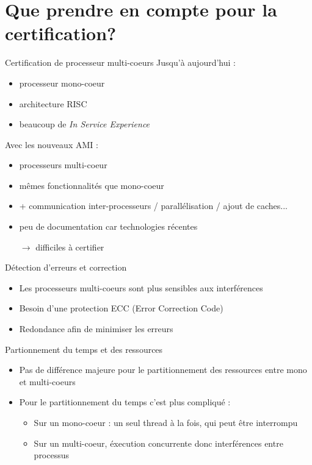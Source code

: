 \documentclass{beamer}
\begin{document}
\section[Certification]{Que prendre en compte pour la certification?}%
\label{sec:certification}
 
\begin{frame}{Certification de processeur multi-coeurs}
	Jusqu'à aujourd'hui :\pause
	\begin{itemize}
		\item processeur mono-coeur\pause
		\item architecture RISC\pause
		\item beaucoup de \textit{In Service Experience}\pause
	\end{itemize}
	Avec les nouveaux AMI :\pause
	\begin{itemize}
		\item processeurs multi-coeur\pause
		\item mêmes fonctionnalités que mono-coeur\pause
		\item + communication inter-processeurs / parallélisation / ajout de caches...\pause
		\item peu de documentation car technologies récentes\pause
		\item[$\rightarrow$] difficiles à certifier
	\end{itemize}
\end{frame}

\begin{frame}{Détection d'erreurs et correction}
	\begin{itemize}
		\item Les processeurs multi-coeurs sont plus sensibles aux interférences\pause
		\item Besoin d'une protection ECC (Error Correction Code)\pause
		\item Redondance afin de minimiser les erreurs
	\end{itemize}
\end{frame}

\begin{frame}{Partionnement du temps et des ressources}
	\begin{itemize}
		\item Pas de différence majeure pour le partitionnement des ressources entre mono
			et multi-coeurs\pause
		\item Pour le partitionnement du temps c'est plus compliqué :\pause
			\begin{itemize}
				\item Sur un mono-coeur : un seul thread à la fois, qui peut être
					interrompu\pause
				\item Sur un multi-coeur, éxecution concurrente donc interférences entre
					processus
			\end{itemize}
	\end{itemize}
\end{frame}
\end{document}
